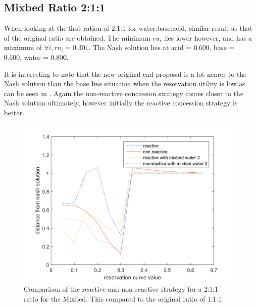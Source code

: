 \subsection{Mixbed Ratio 2:1:1}
When looking at the first ration of 2:1:1 for water:base:acid, similar result as that of the original ratio are obtained. The minimum $ru_i$ lies lower however, and has a maximum of $\forall i, ru_i = 0.301$. The Nash solution lies at acid = 0.600, base = 0.600, water = 0.800.

It is interesting to note that the new original end proposal is a lot nearer to the Nash solution than the base line situation when the reservation utility is low as can be seen in . Again the non-reactive concession strategy comes closer to the Nash solution ultimately, however initially the reactive concession strategy is better. 
\begin{figure}[h]
	\centering
	\includegraphics[width=0.7\linewidth]{img/reactivevsnonreactiveMixbed2.png}
	\caption{Comparison of the reactive and non-reactive strategy for a 2:1:1 ratio for the Mixbed. This compared to the original ratio of 1:1:1}
	\label{fig:reactivevsnon-reactiveMixbed2}
\end{figure}


